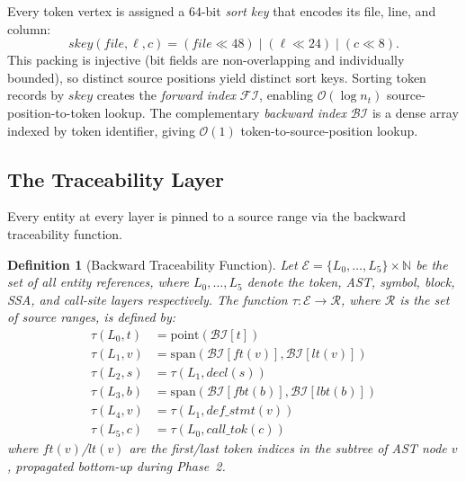 \documentclass[journal,10pt,twoside]{IEEEtran}
\newtheorem{definition}[theorem]{Definition}
\newcommand{\tauF}{\tau}
\newcommand{\FI}{\mathcal{FI}}
\newcommand{\BI}{\mathcal{BI}}
\newcommand{\BigO}{\mathcal{O}}
\newcommand{\sortkey}{\mathit{skey}}
\begin{document}
Every token vertex is assigned a $64$-bit \textit{sort key}
that encodes its file, line, and column:
\begin{equation}\label{eq:sortkey}
\sortkey(\mathit{file}, \ell, c)
  = (\mathit{file} \ll 48) \mid (\ell \ll 24)
    \mid (c \ll 8).
\end{equation}
This packing is injective (bit fields are non-overlapping
and individually bounded), so distinct source positions
yield distinct sort keys.  Sorting token records by
$\sortkey$ creates the \textit{forward index} $\FI$,
enabling $\BigO(\log n_t)$ source-position-to-token lookup.
The complementary \textit{backward index} $\BI$ is a
dense array indexed by token identifier, giving $\BigO(1)$
token-to-source-position lookup.

\subsection{The Traceability Layer}

Every entity at every layer is pinned to a source range
via the backward traceability function.

\begin{definition}[Backward Traceability Function]\label{def:tau}
Let $\mathcal{E} = \{L_0, \ldots, L_5\} \times \mathbb{N}$
be the set of all entity references, where $L_0, \ldots, L_5$
denote the token, AST, symbol, block, SSA, and call-site
layers respectively.  The function
$\tauF : \mathcal{E} \to \mathcal{R}$, where $\mathcal{R}$
is the set of source ranges, is defined by:
\begin{align}
  \tauF(L_0, t) &= \mathrm{point}(\BI[t])
  \label{eq:tau0}\\
  \tauF(L_1, v) &= \mathrm{span}(\BI[\mathit{ft}(v)],
    \BI[\mathit{lt}(v)])
  \label{eq:tau1}\\
  \tauF(L_2, s) &= \tauF(L_1, \mathit{decl}(s))
  \label{eq:tau2}\\
  \tauF(L_3, b) &= \mathrm{span}(\BI[\mathit{fbt}(b)],
    \BI[\mathit{lbt}(b)])
  \label{eq:tau3}\\
  \tauF(L_4, v) &= \tauF(L_1, \mathit{def\_stmt}(v))
  \label{eq:tau4}\\
  \tauF(L_5, c) &= \tauF(L_0, \mathit{call\_tok}(c))
  \label{eq:tau5}
\end{align}
where $\mathit{ft}(v)$/$\mathit{lt}(v)$ are the first/last
token indices in the subtree of AST node $v$, propagated
bottom-up during Phase~2.
\end{definition}
\end{document}
